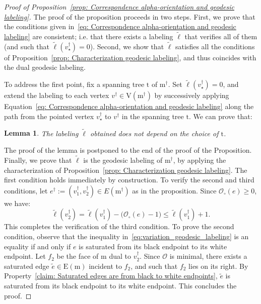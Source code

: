 \documentclass[11pt,reqno,tbtags]{amsart}
\newcommand{\rV}{\mathrm{V}}
\renewcommand{\rm}{\mathrm{m}}
\newcommand{\rt}{\mathrm{t}}
\newtheorem{lemm}[theo]{Lemma}
\numberwithin{equation}{section}
\numberwithin{theo}{section}
\theoremstyle{definition}
\newcommand{\cO}{\mathcal{O}}
\begin{document}
\begin{proof}[Proof of Proposition~\ref{prop: Correspondence alpha-orientation and geodesic labeling}]
The proof of the proposition proceeds in two steps. First, we prove that the conditions given in~\eqref{eq: Correspondence alpha-orientation and geodesic labeling} are consistent; i.e. that there exists a labeling $\tilde{\ell}$ that verifies all of them (and such that $\tilde{\ell}(v_\star^\dagger)=0$). Second, we show that $\tilde{\ell}$ satisfies all the conditions of Proposition~\ref{prop: Characterization geodesic labeling}, and thus coincides with the dual geodesic labeling. 

To address the first point, fix a spanning tree $\rt$ of $\rm^\dagger$. Set $\tilde{\ell}(v_\star^\dagger) = 0$, and extend the labeling to each vertex $v^\dagger \in \rV(\rm^\dagger)$ by successively applying Equation~\eqref{eq: Correspondence alpha-orientation and geodesic labeling} along the path from the pointed vertex $v_\star^\dagger$ to $v^\dagger$ in the spanning tree $\rt$. We can prove that: 

\begin{lemm}\label{lem:labeling_independent}
The labeling $\tilde{\ell}$ obtained does not depend on the choice of $\rt$.
\end{lemm}

The proof of the lemma is postponed to the end of the proof of the Proposition. Finally, we prove that $\tilde \ell$ is the geodesic labeling of $\rm^\dagger$, by applying the characterization of Proposition~\ref{prop: Characterization geodesic labeling}. The first condition holds immediately by construction. To verify the second and third conditions, let $e^\dagger:=(v_1^\dagger,v_2^\dagger)\in E(\rm^\dagger)$ as in the proposition. Since $\cO_\circ(e)\geq 0$, we have:
\begin{equation}\label{eq:variation_geodesic_labeling}  
\tilde{\ell}(v_2^\dagger) = \tilde{\ell}(v_1^\dagger) - \Big(\cO_\circ(e)-1\Big) \leq  \tilde{\ell}(v_1^\dagger)+1.
\end{equation}
This completes the verification of the third condition. To prove the second condition, observe that the inequality in~\eqref{eq:variation_geodesic_labeling} is an equality if and only if $e$ is saturated from its black endpoint to its white endpoint. Let $f_2$ be the face of $\rm$ dual to $v_2^\dagger$. Since $\cO$ is minimal, there exists a saturated edge $\tilde e\in \mathrm{E}(\rm)$ incident to $f_2$, and such that $f_2$ lies on its right. By Property~\ref{claim: Saturated edges are from black to white endpoints}, $\tilde e$ is saturated from its black endpoint to its white endpoint. This concludes the proof.
\end{proof}	
\end{document}
